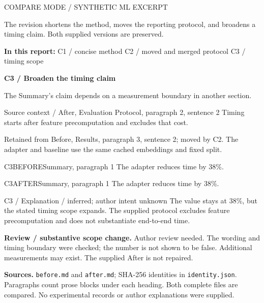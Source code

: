 \documentclass[11pt]{article}
\begin{document}
{\small\color{rcMuted}COMPARE MODE / SYNTHETIC ML EXCERPT}

The revision shortens the method, moves the reporting protocol, and broadens
a timing claim. Both supplied versions are preserved.

{\small\textbf{In this report:} C1 / concise method \quad
C2 / moved and merged protocol \quad C3 / timing scope}

\vspace{8pt}
{\large\bfseries\color{rcInk}C3 / Broaden the timing claim}\par
{\small\color{rcMuted}The Summary's claim depends on a measurement boundary in another section.}

\begin{rcContext}{Source context / After, Evaluation Protocol, paragraph 2, sentence 2}
Timing starts after feature precomputation and excludes that cost.
\end{rcContext}
{\small\color{rcMuted}Retained from Before, Results, paragraph 3, sentence 2;
moved by C2. The adapter and baseline use the same cached embeddings and fixed split.}

\begin{rcPassage}{C3}{BEFORE}{Summary, paragraph 1}
The adapter reduces  time by 38\%.
\end{rcPassage}
\begin{rcPassage}{C3}{AFTER}{Summary, paragraph 1}
The adapter reduces  time by 38\%.
\end{rcPassage}
\begin{rcContext}{C3 / Explanation / inferred; author intent unknown}
The value stays at 38\%, but the stated timing scope expands. The supplied
protocol excludes feature precomputation and does not substantiate
end-to-end time.
\end{rcContext}
\textbf{Review / substantive scope change.} Author review needed.
The wording and timing boundary were checked; the number is not shown to
be false. Additional measurements may exist. The supplied After is not repaired.

\vfill
{\footnotesize\color{rcMuted}\textbf{Sources.} \texttt{before.md} and
\texttt{after.md}; SHA-256 identities in \texttt{identity.json}.
Paragraphs count prose blocks under each heading. Both complete files are
compared. No experimental records or author explanations were supplied.}

\newpage
{}
\end{document}
